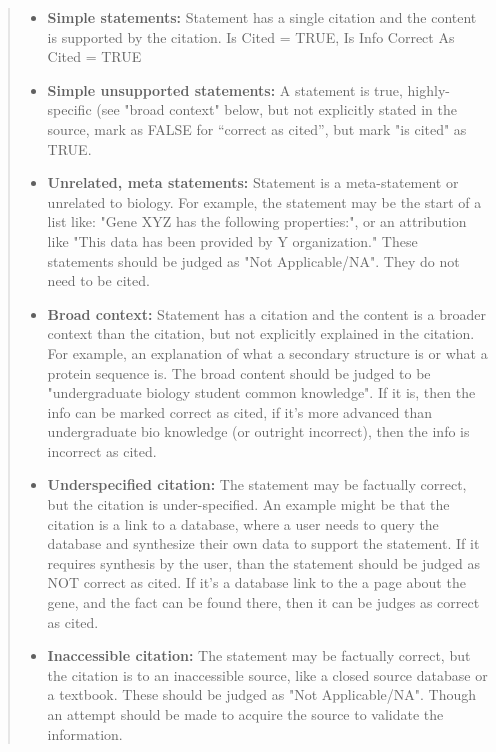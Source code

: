 \documentclass{article}
\begin{document}
\begin{quote}
\begin{itemize}

\item{\textbf{Simple statements:} Statement has a single citation and the content is supported by the citation. Is Cited = TRUE, Is Info Correct As Cited = TRUE}

\item{\textbf{Simple unsupported statements:} A statement is true, highly-specific (see "broad context" below, but not explicitly stated in the source, mark as FALSE for “correct as cited”, but mark "is cited" as TRUE.}

\item{\textbf{Unrelated, meta statements:} Statement is a meta-statement or unrelated to biology. For example, the statement may be the start of a list like: "Gene XYZ has the following properties:", or an attribution like "This data has been provided by Y organization." These statements should be judged as "Not Applicable/NA". They do not need to be cited.}

\item{\textbf{Broad context:} Statement has a citation and the content is a broader context than the citation, but not explicitly explained in the citation. For example, an explanation of what a secondary structure is or what a protein sequence is. The broad content should be judged to be "undergraduate biology student common knowledge". If it is, then the info can be marked correct as cited, if it's more advanced than undergraduate bio knowledge (or outright incorrect), then the info is incorrect as cited.}

\item{\textbf{Underspecified citation:} The statement may be factually correct, but the citation is under-specified. An example might be that the citation is a link to a database, where a user needs to query the database and synthesize their own data to support the statement. If it requires synthesis by the user, than the statement should be judged as NOT correct as cited. If it's a database link to the a page about the gene, and the fact can be found there, then it can be judges as correct as cited. }

\item{\textbf{Inaccessible citation:} The statement may be factually correct, but the citation is to an inaccessible source, like a closed source database or a textbook. These should be judged as "Not Applicable/NA". Though an attempt should be made to acquire the source to validate the information.}


\end{itemize}
\end{quote}
\end{document}
